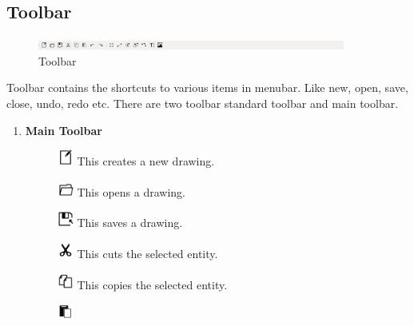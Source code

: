 \subsection{Toolbar}
\begin{figure}[h!]
\centering
\includegraphics[width=0.9\textwidth]{images/toolbar.png}
\caption{Toolbar}
\end{figure}
Toolbar contains the shortcuts to various items in menubar. Like new, open, save, close, undo, redo etc. There are two toolbar standard toolbar and main toolbar.
\begin{enumerate}
\item \textbf{Main Toolbar}
\begin{figure}[h!]
\includegraphics[width=0.05\textwidth]{images/newDrawing.jpg} 
This creates a new drawing.
\end{figure}
\begin{figure}[h!]
\includegraphics[width=0.05\textwidth]{images/openDrawing.jpg} 
This opens a drawing.
\end{figure}
\begin{figure}[h!]
\includegraphics[width=0.05\textwidth]{images/saveDrawing.jpg} 
This saves a drawing.
\end{figure}
\begin{figure}[h!]
\includegraphics[width=0.05\textwidth]{images/cut.jpg} 
This cuts the selected entity.
\end{figure}
\begin{figure}[h!]
\includegraphics[width=0.05\textwidth]{images/copy.jpg} 
This copies the selected entity.
\end{figure}
\begin{figure}[h!]
\includegraphics[width=0.05\textwidth]{images/paste.jpg} 

\end{figure}
\end{enumerate}
